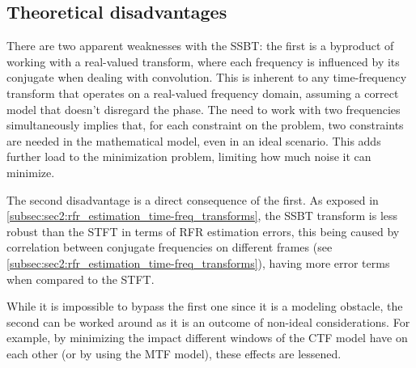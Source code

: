 \subsection{Theoretical disadvantages}

There are two apparent weaknesses with the SSBT: the first is a byproduct of working with a real-valued transform, where each frequency is influenced by its conjugate when dealing with convolution. This is inherent to any time-frequency transform that operates on a real-valued frequency domain, assuming a correct model that doesn't disregard the phase. The need to work with two frequencies simultaneously implies that, for each constraint on the problem, two constraints are needed in the mathematical model, even in an ideal scenario. This adds further load to the minimization problem, limiting how much noise it can minimize.

The second disadvantage is a direct consequence of the first. As exposed in \cref{subsec:sec2:rfr_estimation_time-freq_transforms}, the SSBT transform is less robust than the STFT in terms of RFR estimation errors, this being caused by correlation between conjugate frequencies on different frames (see \cref{subsec:sec2:rfr_estimation_time-freq_transforms}), having more error terms when compared to the STFT.

While it is impossible to bypass the first one since it is a modeling obstacle, the second can be worked around as it is an outcome of non-ideal considerations. For example, by minimizing the impact different windows of the CTF model have on each other (or by using the MTF model), these effects are lessened.